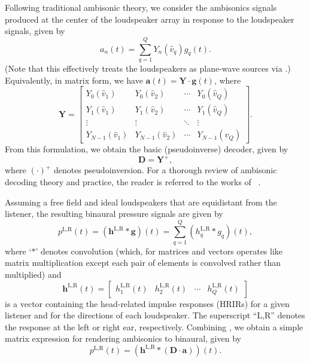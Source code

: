 Following traditional ambisonic theory,
we consider the ambisonics signals produced at the center of the loudspeaker array
in response to the loudspeaker signals, given by
\begin{equation}
a_n(t) = \sum_{q=1}^{Q} Y_{n}(\hat{v}_q) g_q(t).
\end{equation}
(Note that this effectively treats the loudspeakers as plane-wave sources via .)
Equivalently, in matrix form, we have $\mathbf{a}(t) = \mathbf{Y} \cdot \mathbf{g}(t)$, where
\begin{equation}\label{eq:YMatrix}
\mathbf{Y} = 
\begin{bmatrix}
Y_{0}(\hat{v}_1) & Y_{0}(\hat{v}_2) & \cdots & Y_{0}(\hat{v}_Q) \\
Y_{1}(\hat{v}_1) & Y_{1}(\hat{v}_2) & \cdots & Y_{1}(\hat{v}_Q) \\
\vdots & \vdots & \ddots & \vdots \\
Y_{N-1}(\hat{v}_1) & Y_{N-1}(\hat{v}_2) & \cdots & Y_{N-1}(\hat{v}_Q)
\end{bmatrix}.
\end{equation}
From this formulation, we obtain the basic (pseudoinverse) decoder, given by \citep[Appendix~A.1]{Heller2008}
\begin{equation}\label{eq:02_Acoustical_Theory:PinvDecoder}
\mathbf{D} = \mathbf{Y}^{+},
\end{equation}
where $(\cdot)^{+}$ denotes pseudoinversion.
For a thorough review of ambisonic decoding theory and practice,
the reader is referred to the works of \citeauthor{Heller2008}~\citep{Heller2008,Heller2012}.

Assuming a free field and ideal loudspeakers that are equidistant from the listener,
the resulting binaural pressure signals are given by
\begin{equation}\label{eq:02_Acoustical_Theory:VA_Binaural}
p^{\text{L,R}}(t) = \left( \mathbf{h}^{\text{L,R}} \ast \mathbf{g} \right)(t)
 = \sum_{q=1}^Q \left( h_{q}^{\text{L,R}} \ast g_{q} \right) (t),
\end{equation}
where `$\ast$' denotes convolution (which, for matrices and vectors operates like matrix multiplication except each pair of elements is convolved rather than multiplied) and
\begin{equation}
\mathbf{h}^{\text{L,R}}(t) = 
\begin{bmatrix}
h_{1}^{\text{L,R}}(t) & h_{2}^{\text{L,R}}(t) & \cdots & h_{Q}^{\text{L,R}}(t)
\end{bmatrix}
\end{equation}
is a vector containing the head-related impulse responses (HRIRs) for a given listener
and for the directions of each loudspeaker.
The superscript ``$\text{L,R}$'' denotes the response at the left or right ear, respectively.
Combining ,
we obtain a simple matrix expression for rendering ambisonics to binaural, given by
\begin{equation}\label{eq:02_Acoustical_Theory:VA_Binaural_Matrix}
p^{\text{L,R}}(t) = \left( \mathbf{h}^{\text{L,R}} \ast \left( \mathbf{D} \cdot \mathbf{a} \right) \right)(t).
\end{equation}

